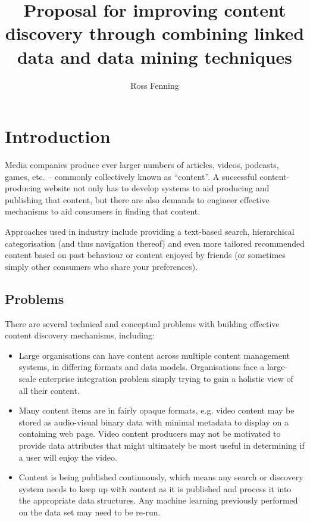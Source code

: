 \documentclass[10pt,a4paper]{report}
\title{Proposal for improving content discovery through combining linked data
and data mining techniques}
\author{Ross Fenning}
\begin{document}
\maketitle

\chapter{Introduction}

Media companies produce ever larger numbers of articles, videos, podcasts,
games, etc. -- commonly collectively known as ``content''. A successful
content-producing website not only has to develop systems to aid producing and
publishing that content, but there are also demands to engineer effective
mechanisms to aid consumers in finding that content.

Approaches used in industry include providing a text-based search, hierarchical
categorisation (and thus navigation thereof) and even more tailored recommended
content based on past behaviour or content enjoyed by friends (or sometimes
simply other consumers who share your preferences).

\section{Problems}

There are several technical and conceptual problems with building effective
content discovery mechanisms, including:

\begin{itemize}

\item Large organisations can have content across multiple content management
systems, in differing formats and data models. Organisations face a large-scale
enterprise integration problem simply trying to gain a holistic view of all
their content.

\item Many content items are in fairly opaque formats, e.g. video content may be
stored as audio-visual binary data with minimal metadata to display on a
containing web page. Video content producers may not be motivated to provide
data attributes that might ultimately be most useful in determining if a user
will enjoy the video.

\item Content is being published continuously, which means any search or
discovery system needs to keep up with content as it is published and process it
into the appropriate data structures. Any machine learning previously performed
on the data set may need to be re-run.

\end{itemize}
\end{document}
